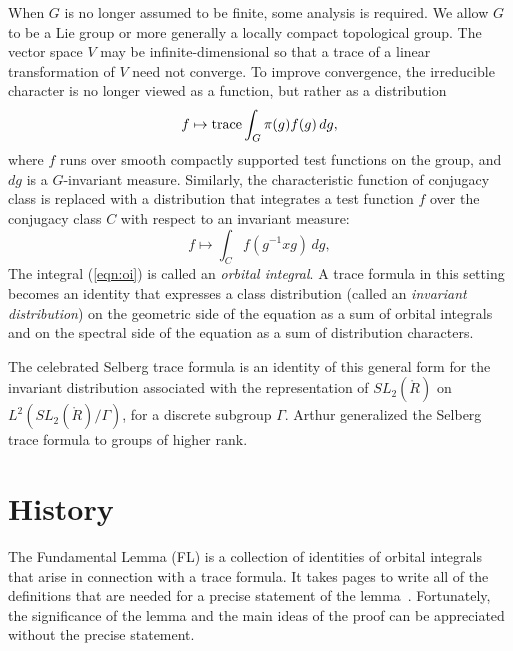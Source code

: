 When $G$ is no longer assumed to be finite, some analysis is
required.  We allow $G$ to be a Lie group or more generally a locally
compact topological group.  The vector space $V$ may be 
infinite-dimensional so that a  trace of a linear
transformation of $V$ need not converge.  To improve convergence,
the irreducible character is no longer viewed as a function, but rather as a
distribution
\[
f \mapsto {\operatorname{trace}} \int_{G} \pi(g) f(g) \, dg,
\]
where $f$ runs over smooth compactly supported test functions on
the group, and $dg$ is a $G$-invariant measure.  Similarly, the
characteristic function of conjugacy class is replaced with a
distribution that integrates a test function $f$ over the
conjugacy class $C$ with respect to an invariant measure:
\begin{equation}\label{eqn:oi}
f \mapsto \int_C f(g^{-1} x g) \, dg,
\end{equation}
The integral (\ref{eqn:oi}) is called an {\it orbital integral}.  A
trace formula in this setting becomes an identity that expresses a
class distribution (called an {\it invariant distribution}) on the
geometric side of the equation as a sum of orbital integrals and on
the spectral side of the equation as a sum of distribution characters.

The celebrated Selberg trace formula is an identity of this general
form for the invariant distribution associated with the representation
of $SL_2(\ring{R})$ on $L^2(SL_2(\ring{R})/\Gamma)$, for a discrete
subgroup $\Gamma$.  Arthur generalized the Selberg trace formula to
groups of higher rank.


\section{History}

The Fundamental Lemma (FL) is a collection of identities of orbital
integrals that arise in connection with a trace formula.  It takes
pages to write all of the definitions that are needed for a precise
statement of the lemma~\cite{Hales:FL-statement}.  Fortunately, the
significance of the lemma and the main ideas of the proof can be
appreciated without the precise statement.

